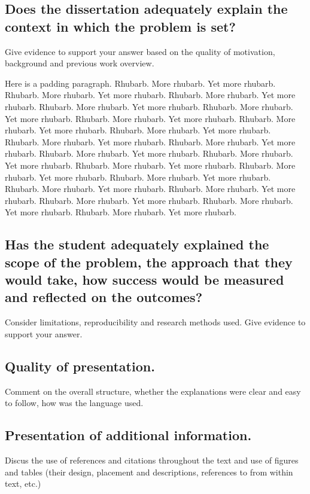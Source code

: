 \documentclass{article}
\begin{document}
\subsection*{Does the dissertation adequately explain the context in which the problem is set?}

Give evidence to support your answer based on the quality of motivation, background and previous work overview.

Here is a padding paragraph.  Rhubarb.  More rhubarb.  Yet more rhubarb. 
Rhubarb.  More rhubarb.  Yet more rhubarb.  Rhubarb.  More rhubarb.  Yet
more rhubarb.  Rhubarb.  More rhubarb.  Yet more rhubarb.  Rhubarb. 
More rhubarb.  Yet more rhubarb.  Rhubarb.  More rhubarb.  Yet more
rhubarb.  Rhubarb.  More rhubarb.  Yet more rhubarb.  Rhubarb.  More
rhubarb.  Yet more rhubarb.  Rhubarb.  More rhubarb.  Yet more rhubarb. 
Rhubarb.  More rhubarb.  Yet more rhubarb.  Rhubarb.  More rhubarb.  Yet
more rhubarb.  Rhubarb.  More rhubarb.  Yet more rhubarb.  Rhubarb. 
More rhubarb.  Yet more rhubarb.  Rhubarb.  More rhubarb.  Yet more
rhubarb.  Rhubarb.  More rhubarb.  Yet more rhubarb.   Rhubarb.  More
rhubarb.  Yet more rhubarb.   Rhubarb.  More rhubarb.  Yet more
rhubarb.  Rhubarb.  More rhubarb.  Yet more rhubarb.    Rhubarb.  More
rhubarb.  Yet more rhubarb.  Rhubarb.  More rhubarb.  Yet more rhubarb. 

\subsection*{Has the student adequately explained the scope of the problem, the approach that they would take, how success would be measured and reflected on the outcomes?}

Consider limitations, reproducibility and research methods used. Give evidence to support your answer. 

\subsection*{Quality of presentation.}
Comment on the overall structure, whether the explanations were clear and easy to follow, how was the language used. 

\subsection*{Presentation of additional information.}
Discus the use of references and citations throughout the text and use of figures and tables (their design, placement and descriptions, references to from within text, etc.)
\end{document}
